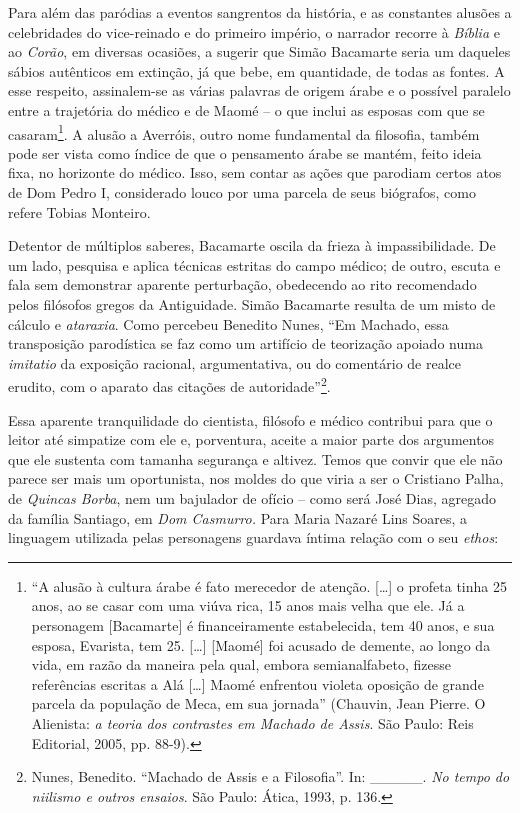 Para além das paródias a eventos sangrentos da história, e as constantes
alusões a celebridades do vice-reinado e do primeiro império, o narrador
recorre à \emph{Bíblia} e ao \emph{Corão}, em diversas ocasiões, a
sugerir que Simão Bacamarte seria um daqueles sábios autênticos em
extinção, já que bebe, em quantidade, de todas as fontes. A esse
respeito, assinalem-se as várias palavras de origem árabe e o possível
paralelo entre a trajetória do médico e de Maomé -- o que inclui as
esposas com que se casaram\footnote{``A alusão à cultura árabe é fato
  merecedor de atenção. {[}\ldots{}{]} o profeta tinha 25 anos, ao se
  casar com uma viúva rica, 15 anos mais velha que ele. Já a personagem
  {[}Bacamarte{]} é financeiramente estabelecida, tem 40 anos, e sua
  esposa, Evarista, tem 25. {[}\ldots{}{]} {[}Maomé{]} foi acusado de
  demente, ao longo da vida, em razão da maneira pela qual, embora
  semianalfabeto, fizesse referências escritas a Alá {[}\ldots{}{]}
  Maomé enfrentou violeta oposição de grande parcela da população de
  Meca, em sua jornada'' (Chauvin, Jean Pierre. O Alienista: \emph{a
  teoria dos contrastes em Machado de Assis}. São Paulo: Reis Editorial,
  2005, pp. 88-9).}. A alusão a Averróis, outro nome fundamental da
filosofia, também pode ser vista como índice de que o pensamento árabe
se mantém, feito ideia fixa, no horizonte do médico. Isso, sem contar as
ações que parodiam certos atos de Dom Pedro I, considerado louco por uma
parcela de seus biógrafos, como refere Tobias Monteiro.

Detentor de múltiplos saberes, Bacamarte oscila da frieza à
impassibilidade. De um lado, pesquisa e aplica técnicas estritas do
campo médico; de outro, escuta e fala sem demonstrar aparente
perturbação, obedecendo ao rito recomendado pelos filósofos gregos da
Antiguidade. Simão Bacamarte resulta de um misto de cálculo e
\emph{ataraxia}. Como percebeu Benedito Nunes, ``Em Machado, essa
transposição parodística se faz como um artifício de teorização apoiado
numa \emph{imitatio} da exposição racional, argumentativa, ou do
comentário de realce erudito, com o aparato das citações de
autoridade''\footnote{Nunes, Benedito. ``Machado de Assis e a
  Filosofia''. In: \_\_\_\_\_. \emph{No tempo do niilismo e outros
  ensaios}. São Paulo: Ática, 1993, p. 136.}.

Essa aparente tranquilidade do cientista, filósofo e médico contribui
para que o leitor até simpatize com ele e, porventura, aceite a maior
parte dos argumentos que ele sustenta com tamanha segurança e altivez.
Temos que convir que ele não parece ser mais um oportunista, nos moldes
do que viria a ser o Cristiano Palha, de \emph{Quincas Borba}, nem um
bajulador de ofício -- como será José Dias, agregado da família
Santiago, em \emph{Dom Casmurro.} Para Maria Nazaré Lins Soares, a
linguagem utilizada pelas personagens guardava íntima relação com o seu
\emph{ethos}:

